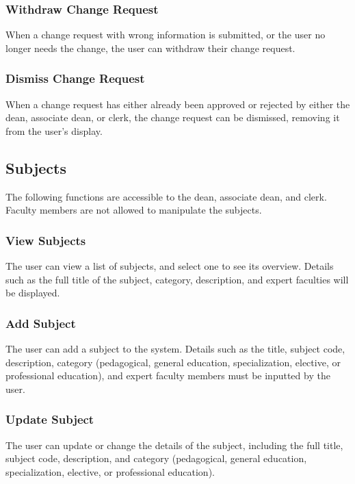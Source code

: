         \subsubsection{Withdraw Change Request}
        When a change request with wrong information is submitted, or the user no longer needs the change, the user can withdraw their change request.
        
        \subsubsection{Dismiss Change Request}
        When a change request has either already been approved or rejected by either the dean, associate dean, or clerk, the change request can be dismissed, removing it from the user's display.
    
    \subsection{Subjects}
    The following functions are accessible to the dean, associate dean, and clerk. Faculty members are not allowed to manipulate the subjects.
    
        \subsubsection{View Subjects}
        The user can view a list of subjects, and select one to see its overview. Details such as the full title of the subject, category, description, and expert faculties will be displayed.
        
        \subsubsection{Add Subject}
        The user can add a subject to the system. Details such as the title, subject code, description, category (pedagogical, general education, specialization, elective, or professional education), and expert faculty members must be inputted by the user.
        
        \subsubsection{Update Subject}
        The user can update or change the details of the subject, including the full title, subject code, description, and category (pedagogical, general education, specialization, elective, or professional education).
        
